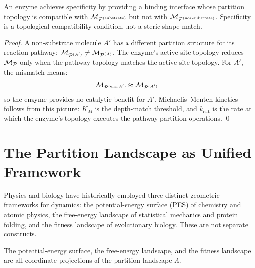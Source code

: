 \begin{corollary}
\label{cor:enzymatic_specificity}
An enzyme achieves specificity by providing a binding interface whose partition
topology is compatible with $\mathcal{M}_{\mathcal{P}^{(\text{substrate})}}$ but not
with $\mathcal{M}_{\mathcal{P}^{(\text{non-substrate})}}$. Specificity is a
topological compatibility condition, not a steric shape match.
\end{corollary}

\begin{proof}
A non-substrate molecule $A'$ has a different partition structure for its
reaction pathway: $\mathcal{M}_{\mathcal{P}^{(A')}} \neq \mathcal{M}_{\mathcal{P}^{(A)}}$.
The enzyme's active-site topology reduces $\mathcal{M}_{\mathcal{P}}$ only when
the pathway topology matches the active-site topology. For $A'$, the
mismatch means:
\begin{equation}
  \mathcal{M}_{\mathcal{P}^{(\text{enz}, A')}} \approx \mathcal{M}_{\mathcal{P}^{(A')}},
\end{equation}
so the enzyme provides no catalytic benefit for $A'$. Michaelis--Menten
kinetics follows from this picture: $K_M$ is the depth-match threshold,
and $k_{\mathrm{cat}}$ is the rate at which the enzyme's topology executes
the pathway partition operations. \qed
\end{proof}

\section{The Partition Landscape as Unified Framework}
\label{sec:landscape_unified}

Physics and biology have historically employed three distinct geometric
frameworks for dynamics: the potential-energy surface (PES) of chemistry and
atomic physics, the free-energy landscape of statistical mechanics and protein
folding, and the fitness landscape of evolutionary biology. These are not
separate constructs.

\begin{theorem}
\label{thm:landscape_unification}
The potential-energy surface, the free-energy landscape, and the fitness
landscape are all coordinate projections of the partition landscape $\Lambda$.
\end{theorem}

